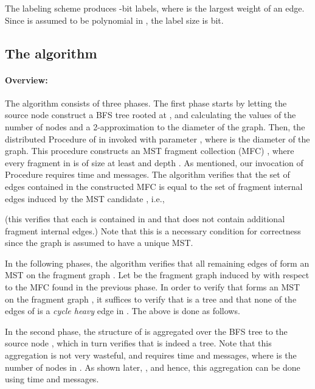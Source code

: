 \documentclass[11pt,letter]{article}
\begin{document}
The labeling scheme    produces -bit labels, 
where  is the largest weight of an edge. Since  is assumed to be 
polynomial in , the label size is  bit.

\subsection{The algorithm}

\paragraph{Overview:} The algorithm consists of three  phases. The first phase  starts by letting the source node  construct a BFS tree rooted at , and calculating the values of the number of nodes  and a 2-approximation  to the diameter  of the graph. Then, the distributed 
Procedure  of \cite{KP_98} in invoked with parameter , where  is the diameter of the graph. This procedure constructs an MST fragment collection 
(MFC) , where every fragment in 
is of size at least  and depth . As mentioned, our invocation of Procedure  requires  time and 
 messages.
The algorithm verifies that the set of edges contained in the constructed MFC 
is equal to the set of fragment internal edges induced by the MST candidate , i.e., 
 
(this verifies that each  is contained in  and that   does not contain additional fragment internal edges.)
Note that this is a necessary  condition for correctness since the graph is assumed to have  a unique MST. 

In the following phases, the algorithm verifies that all remaining edges of   form an MST on the fragment graph . Let  be the fragment 
graph induced by  with respect to the MFC  found in the previous phase.
In order to verify that  forms an MST on the 
fragment graph , it suffices to verify that  is a tree and 
that none of the edges of  is  a {\em cycle heavy} edge in  .
The above is done as follows. 

In the second phase, the structure of   is aggregated over the BFS tree to the source node , which in turn verifies that
  is indeed a tree. Note that this aggregation is not very wasteful, and requires  time and  messages, where  is the number of nodes in . As shown later, , and hence, this aggregation can be done using  time and 
 messages.
\end{document}
